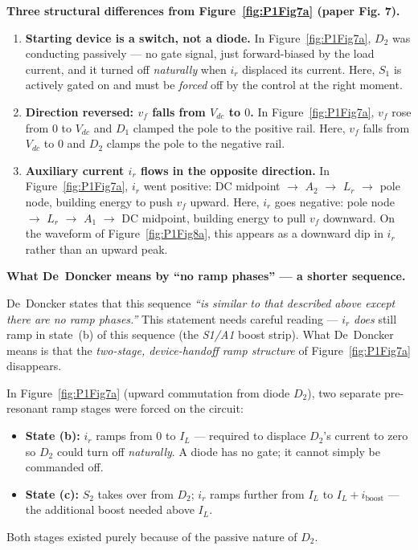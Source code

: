 \documentclass[12pt, a4paper]{article}
\def\,{ }%
\newcommand{\Vdc}{V_{dc}}
\newcommand{\vf}{v_f}
\newcommand{\ir}{i_r}
\newcommand{\IL}{I_L}
\newcommand{\Lr}{L_r}
\newcommand{\figref}[1]{Figure~\ref{#1}}
\begin{document}
\medskip
\textbf{Three structural differences from \figref{fig:P1Fig7a} (paper Fig.\,7).}

\begin{enumerate}
    \item \textbf{Starting device is a switch, not a diode.}
          In \figref{fig:P1Fig7a}, $D_2$ was conducting passively --- no
          gate signal, just forward-biased by the load current, and it
          turned off \emph{naturally} when $\ir$ displaced its current.
          Here, $S_1$ is actively gated on and must be \emph{forced} off
          by the control at the right moment.

    \item \textbf{Direction reversed: $\vf$ falls from $\Vdc$ to $0$.}
          In \figref{fig:P1Fig7a}, $\vf$ rose from $0$ to $\Vdc$ and
          $D_1$ clamped the pole to the positive rail.
          Here, $\vf$ falls from $\Vdc$ to $0$ and $D_2$ clamps the pole
          to the negative rail.

    \item \textbf{Auxiliary current $\ir$ flows in the opposite direction.}
          In \figref{fig:P1Fig7a}, $\ir$ went positive: DC midpoint
          $\to$ $A_2$ $\to$ $\Lr$ $\to$ pole node, building energy to
          push $\vf$ upward.
          Here, $\ir$ goes negative: pole node $\to$ $\Lr$ $\to$ $A_1$
          $\to$ DC midpoint, building energy to pull $\vf$ downward.
          On the waveform of \figref{fig:P1Fig8a}, this appears as a
          downward dip in $\ir$ rather than an upward peak.
\end{enumerate}

\medskip
\textbf{What De~Doncker means by ``no ramp phases'' --- a shorter sequence.}

De~Doncker states that this sequence \textit{``is similar to that
described above except there are no ramp phases.''}
This statement needs careful reading --- $\ir$ \emph{does} still ramp
in state~(b) of this sequence (the \textit{S1/A1} boost strip).
What De~Doncker means is that the \emph{two-stage, device-handoff ramp
structure} of \figref{fig:P1Fig7a} disappears.

In \figref{fig:P1Fig7a} (upward commutation from diode $D_2$), two
separate pre-resonant ramp stages were forced on the circuit:
\begin{itemize}
    \item \textbf{State (b):} $\ir$ ramps from 0 to $\IL$ --- required
          to displace $D_2$'s current to zero so $D_2$ could turn off
          \emph{naturally}.  A diode has no gate; it cannot simply be
          commanded off.
    \item \textbf{State (c):} $S_2$ takes over from $D_2$; $\ir$
          ramps further from $\IL$ to $\IL + i_\text{boost}$ --- the
          additional boost needed above $\IL$.
\end{itemize}
Both stages existed purely because of the passive nature of $D_2$.
\end{document}
